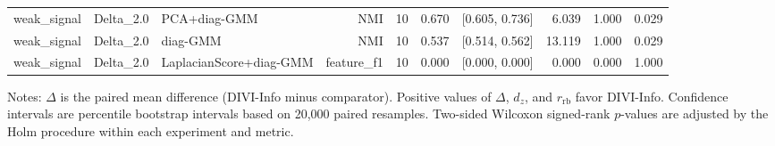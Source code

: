 \begin{table}[t]
\begin{tabular}{lllrrrrrr}
weak\_signal & Delta\_2.0 & PCA+diag-GMM & NMI & 10 & 0.670 & [0.605, 0.736] & 6.039 & 1.000 & 0.029 \\
weak\_signal & Delta\_2.0 & diag-GMM & NMI & 10 & 0.537 & [0.514, 0.562] & 13.119 & 1.000 & 0.029 \\
weak\_signal & Delta\_2.0 & LaplacianScore+diag-GMM & feature\_f1 & 10 & 0.000 & [0.000, 0.000] & 0.000 & 0.000 & 1.000 \\
\bottomrule
\end{tabular}
\begin{flushleft}
\footnotesize
Notes: $\Delta$ is the paired mean difference (DIVI-Info minus comparator). Positive values of $\Delta$, $d_z$, and $r_{\mathrm{rb}}$ favor DIVI-Info. Confidence intervals are percentile bootstrap intervals based on 20,000 paired resamples. Two-sided Wilcoxon signed-rank $p$-values are adjusted by the Holm procedure within each experiment and metric.
\end{flushleft}
\end{table}